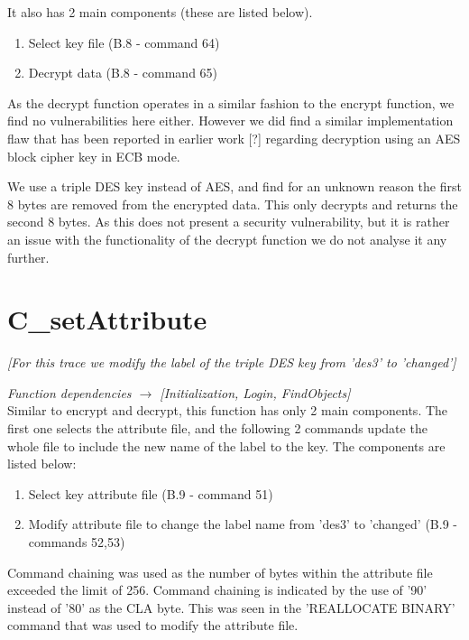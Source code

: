 \documentclass[bsc,frontabs,twoside,singlespacing,parskip,deptreport]{infthesis}     %
\begin{document}
It also has 2 main components (these are listed below).\\

\begin{enumerate}
\item Select key file (B.8 - command 64)
\item Decrypt data (B.8 - command 65)\\
\end{enumerate}

As the decrypt function operates in a similar fashion to the encrypt function, we find no vulnerabilities here either. However we did find a similar implementation flaw that has been reported in earlier work [?] regarding decryption using an AES block cipher key in ECB mode. 

We use a triple DES key instead of AES, and find for an unknown reason the first 8 bytes are removed from the encrypted data. This only decrypts and returns the second 8 bytes. As this does not present a security vulnerability, but it is rather an issue with the functionality of the decrypt function we do not analyse it any further.

\section{C\_setAttribute}
\textit{[For this trace we modify the label of the triple DES key from 'des3' to 'changed']}

\textit{Function dependencies $\rightarrow$ [Initialization, Login, FindObjects]}\\

Similar to encrypt and decrypt, this function has only 2 main components. The first one selects the attribute file, and the following 2 commands update the whole file to include the new name of the label to the key. The components are listed below:\\

\begin{enumerate}
\item Select key attribute file (B.9 - command 51)
\item Modify attribute file to change the label name from 'des3' to  'changed' (B.9 - commands 52,53)\\
\end{enumerate}

Command chaining was used as the number of bytes within the attribute file exceeded the limit of 256. Command chaining is indicated by the use of '90' instead of '80' as the CLA byte. This was seen in the 'REALLOCATE BINARY' command that was used to modify the attribute file.
\end{document}
